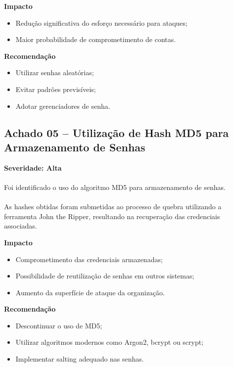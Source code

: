 \textbf{Impacto}

\begin{itemize}
  \item Redução significativa do esforço necessário para ataques;
  \item Maior probabilidade de comprometimento de contas.
\end{itemize}

\textbf{Recomendação}

\begin{itemize}
  \item Utilizar senhas aleatórias;
  \item Evitar padrões previsíveis;
  \item Adotar gerenciadores de senha.
\end{itemize}

\subsection{Achado 05 -- Utilização de Hash MD5 para Armazenamento de Senhas}

\textbf{Severidade: Alta}

\paragraph{}
Foi identificado o uso do algoritmo MD5 para armazenamento de senhas.

\paragraph{}
As hashes obtidas foram submetidas ao processo de quebra utilizando a ferramenta
John the Ripper, resultando na recuperação das credenciais associadas.

\textbf{Impacto}

\begin{itemize}
  \item Comprometimento das credenciais armazenadas;
  \item Possibilidade de reutilização de senhas em outros sistemas;
  \item Aumento da superfície de ataque da organização.
\end{itemize}

\textbf{Recomendação}

\begin{itemize}
  \item Descontinuar o uso de MD5;
  \item Utilizar algoritmos modernos como Argon2, bcrypt ou scrypt;
  \item Implementar salting adequado nas senhas.
\end{itemize}
